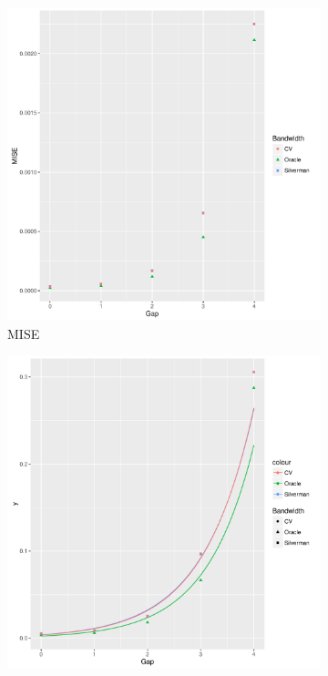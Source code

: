 \begin{figure}[htbp]
    \centering
    \begin{subfigure}[b]{0.3\textwidth}
    \includegraphics[width=\textwidth]{results/by_pop_risk_distance/MISE-vs-population-risk-gap}
    \caption{MISE}
    \end{subfigure}
    \begin{subfigure}[b]{0.3\textwidth}
    \includegraphics[width=\textwidth]{results/by_pop_risk_distance/RMISE-vs-population-risk-gap}

\end{subfigure}
\end{figure}
